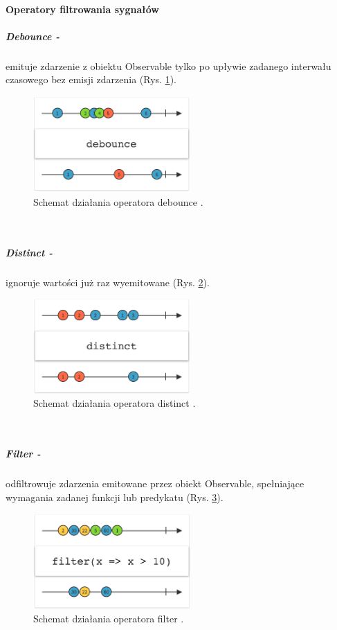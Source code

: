 \documentclass[12pt,oneside,a4paper]{report}
\begin{document}
\paragraph{Operatory filtrowania sygnałów}
\subparagraph{Debounce -}emituje zdarzenie z obiektu Observable tylko po upływie zadanego interwału czasowego bez emisji zdarzenia (Rys. \ref{debounce}).
\begin{figure}[ht!]
	\centering
	\includegraphics[width=6cm]{debounce}
	\caption{Schemat działania operatora debounce \cite{marbles}.}
	\label{debounce}
\end{figure}\\
\subparagraph{Distinct -}ignoruje wartości już raz wyemitowane (Rys. \ref{distinct}).
\begin{figure}[ht!]
	\centering
	\includegraphics[width=6cm]{distinct}
	\caption{Schemat działania operatora distinct \cite{marbles}.}
	\label{distinct}
\end{figure}\\
\subparagraph{Filter -}odfiltrowuje zdarzenia emitowane przez obiekt Observable, spełniające wymagania zadanej funkcji lub predykatu (Rys. \ref{filter}).
\begin{figure}[ht!]
	\centering
	\includegraphics[width=6cm]{filter}
	\caption{Schemat działania operatora filter \cite{marbles}.}
	\label{filter}
\end{figure}
\\\\\\\\\\\\\\\\\\
\end{document}
